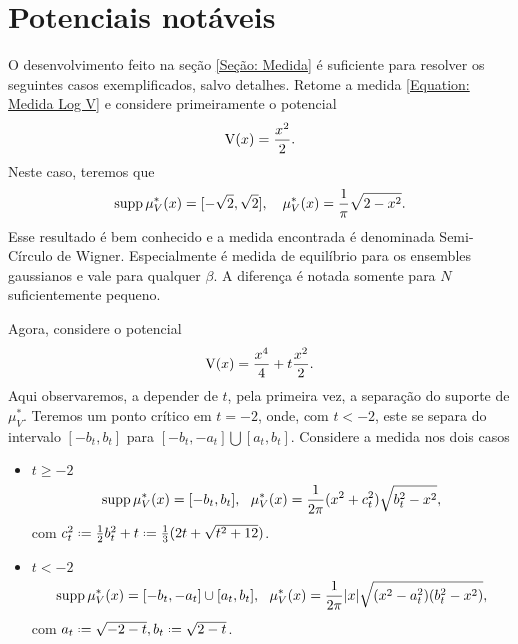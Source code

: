 \section{Potenciais notáveis}
\label{Section: Potencias}

 O desenvolvimento feito na seção \ref{Seção: Medida} é suficiente para resolver os seguintes casos exemplificados, salvo detalhes. Retome a medida \ref{Equation: Medida Log V} e considere primeiramente o potencial $$\operatorname{V}(x) = \frac{x^2}{2}.$$ Neste caso, teremos que
\begin{equation}
	 \supp{\mu^*_V(x)} = [-\sqrt{2}, \sqrt{2}], \ \ \ \mu^*_V(x) = \frac{1}{\pi} \sqrt{2 - x^2}.
	 \label{Equação: Quadrático}
\end{equation}
Esse resultado é bem conhecido e a medida encontrada é denominada Semi-Círculo de Wigner. Especialmente é medida de equilíbrio para os ensembles gaussianos e vale para qualquer $\beta$. A diferença é notada somente para $N$ suficientemente pequeno.

Agora, considere o potencial $$\operatorname{V}(x) = \frac{x^4}{4} + t \frac{x^2}{2}.$$ Aqui observaremos, a depender de $t$, pela primeira vez, a separação do suporte de $\mu^*_V$. Teremos um ponto crítico em $t=-2$, onde, com $t < -2$, este se separa do intervalo $[-b_t, b_t]$ para $[-b_t, -a_t] \bigcup [a_t, b_t]$. Considere a medida nos dois casos
\begin{itemize}
	\item \(t \geq -2\)
	\begin{equation}
	\supp \mu^*_V(x) = [-b_t, b_t], \ \ \mu^*_V(x) = \frac{1}{2\pi} (x^2 + c_t^2) \sqrt{b_t^2 - x^2},\label{Equação: Quartico +}
	\end{equation}
	com $c_t^2 \deff\frac{1}{2} b_t^2 + t \deff \frac{1}{3} (2t + \sqrt{t^2 + 12})$.
	\item \(t < -2\)
	\begin{equation}
	\operatorname{supp} \mu^*_V(x) = [-b_t, -a_t] \cup [a_t, b_t], \ \ \mu^*_V(x) = \frac{1}{2\pi} |x| \sqrt{(x^2 - a_t^2)(b_t^2 - x^2)},
	\label{Equação: Quartico -}
	\end{equation}
	com $ a_t \deff \sqrt{-2-t}, b_t \deff \sqrt{2-t}$.
\end{itemize}





